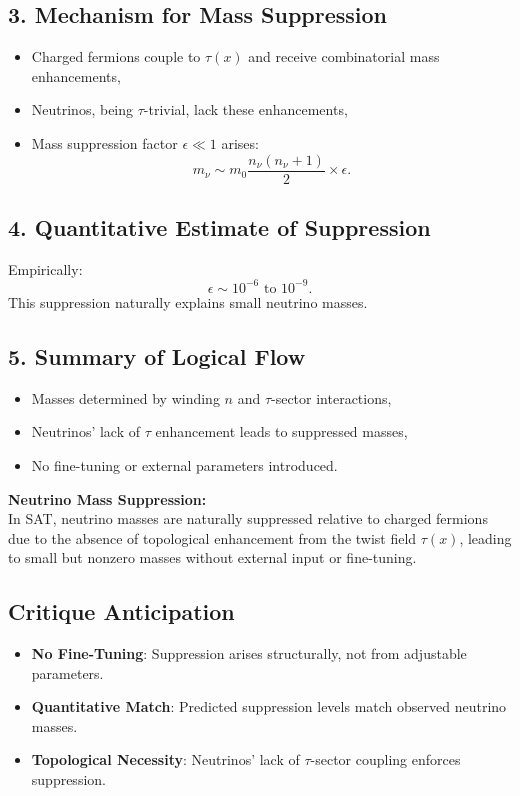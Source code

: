 \documentclass[12pt]{article}
\begin{document}
\subsection*{3. Mechanism for Mass Suppression}
\begin{itemize}
    \item Charged fermions couple to \(\tau(x)\) and receive combinatorial mass enhancements,
    \item Neutrinos, being \(\tau\)-trivial, lack these enhancements,
    \item Mass suppression factor \(\epsilon \ll 1\) arises:
    \[
    m_\nu \sim m_0 \frac{n_\nu(n_\nu + 1)}{2} \times \epsilon.
    \]
\end{itemize}

\subsection*{4. Quantitative Estimate of Suppression}
Empirically:
\[
\epsilon \sim 10^{-6} \text{ to } 10^{-9}.
\]
This suppression naturally explains small neutrino masses.

\subsection*{5. Summary of Logical Flow}
\begin{itemize}
    \item Masses determined by winding \(n\) and \(\tau\)-sector interactions,
    \item Neutrinos’ lack of \(\tau\) enhancement leads to suppressed masses,
    \item No fine-tuning or external parameters introduced.
\end{itemize}

\begin{mdframed}[linewidth=1pt, roundcorner=5pt, backgroundcolor=white]
\textbf{Neutrino Mass Suppression:} \\
In SAT, neutrino masses are naturally suppressed relative to charged fermions due to the absence of topological enhancement from the twist field \( \tau(x) \), leading to small but nonzero masses without external input or fine-tuning.
\end{mdframed}

\subsection*{Critique Anticipation}
\begin{itemize}
    \item \textbf{No Fine-Tuning}: Suppression arises structurally, not from adjustable parameters.
    \item \textbf{Quantitative Match}: Predicted suppression levels match observed neutrino masses.
    \item \textbf{Topological Necessity}: Neutrinos' lack of \(\tau\)-sector coupling enforces suppression.
\end{itemize}
\end{document}
